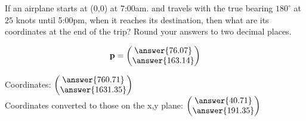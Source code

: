 \documentclass{ximera}
\author{Parisa Fatheddin}
\begin{document}
\begin{exercise}

If an airplane starts at (0,0) at 7:00am. and travels with the true bearing $180^\circ$ at $25$ knots until 5:00pm, when it reaches its destination, then what are its coordinates at the end of the trip? Round your answers to two decimal places.

\begin{prompt}
\[\vec{p} = \begin{pmatrix} \answer{76.07} \\
\answer{163.14}
\end{pmatrix}\]

Coordinates: $\begin{pmatrix} \answer{760.71} \\
\answer{1631.35}\end{pmatrix} $ \\

Coordinates converted to those on the x,y plane:  $\begin{pmatrix} \answer{40.71} \\
\answer{191.35}\end{pmatrix}$

\end{prompt}
































\end{exercise}
\end{document}
